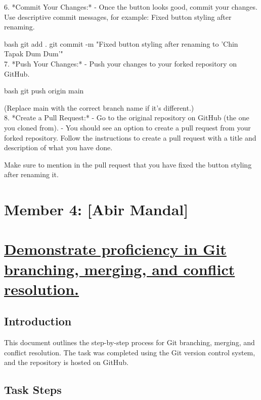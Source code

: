 \documentclass[a4paper,12pt]{article}
\begin{document}
6. *Commit Your Changes:*
   - Once the button looks good, commit your changes. Use descriptive commit messages, for example: Fixed button styling after renaming.

   bash
   git add .
   git commit -m "Fixed button styling after renaming to 'Chin Tapak Dum Dum'"
   \\
   
7. *Push Your Changes:*
   - Push your changes to your forked repository on GitHub.

   bash
   git push origin main
   

   (Replace main with the correct branch name if it's different.)\\
   
8. *Create a Pull Request:*
   - Go to the original repository on GitHub (the one you cloned from).
   - You should see an option to create a pull request from your forked repository. Follow the instructions to create a pull request with a title and description of what you have done.

   Make sure to mention in the pull request that you have fixed the button styling after renaming it.


\newpage

\section*{Member 4: [Abir Mandal]}
\date{\today}

\section*{\uline{Demonstrate proficiency in Git branching, merging, and conflict resolution.}}


\subsection{Introduction}
This document outlines the step-by-step process for Git branching, merging, and conflict resolution. The task was completed using the Git version control system, and the repository is hosted on GitHub.

\subsection{Task Steps}
\end{document}
